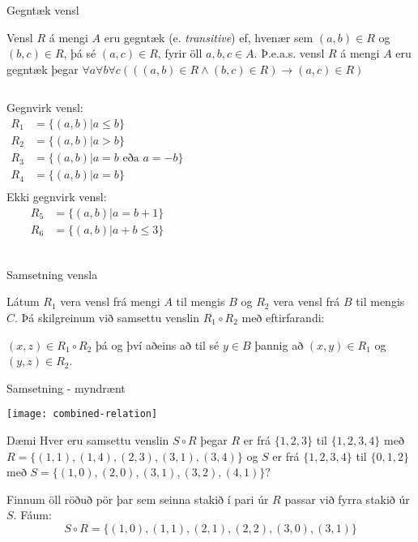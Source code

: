 \documentclass[handout]{beamer}
\begin{document}
\begin{frame}[fragile]{Gegntæk vensl}
\begin{tcolorbox}[title=Gegntæk vensl]
Vensl $R$ á mengi $A$ eru gegntæk (e. \emph{transitive}) ef, hvenær sem $(a, b) \in R$ og $(b, c) \in R$, þá sé $(a, c) \in R$, fyrir öll $a, b, c \in A$. Þ.e.a.s. vensl $R$ á mengi $A$ eru gegntæk þegar $\forall a\forall b\forall c(((a, b) \in R \land (b, c) \in R) \to (a, c) \in R)$
\end{tcolorbox}
\begin{columns}
Gegnvirk vensl:
\begin{align*}
R_1 &= \{(a, b)|a \leq b\}\\
R_2 &= \{(a, b)|a > b\}\\
R_3 &= \{(a, b)|a = b \text{ eða } a = -b\}\\
R_4 &= \{(a, b)|a = b\}\\
\end{align*}
Ekki gegnvirk vensl:
\begin{align*}
R_5 &= \{(a, b)|a = b+1\}\\
R_6 &= \{(a, b)|a+b \leq 3\}\\
\end{align*}
\end{columns}
\end{frame}

\begin{frame}{Samsetning vensla}
\begin{tcolorbox}[title=Samsetning vensla]
Látum $R_1$ vera vensl frá mengi $A$ til mengis $B$ og $R_2$ vera vensl frá $B$ til mengis $C$. Þá skilgreinum við samsettu venslin $R_1 \circ R_2$ með eftirfarandi:

$(x,z) \in R_1 \circ R_2$ þá og því aðeins að til sé $y \in B$ þannig að $(x,y) \in R_1$ og $(y,z) \in R_2$.
\end{tcolorbox}
\end{frame}

\begin{frame}{Samsetning - myndrænt}
\begin{center}
\texttt{[image: combined-relation]}
\end{center}
\end{frame}

\begin{frame}{Dæmi}
Hver eru samsettu venslin $S \circ R$ þegar $R$ er frá $\{1, 2, 3\}$ til $\{1, 2, 3, 4\}$ með $R = \{(1, 1), (1, 4), (2, 3), (3, 1), (3, 4)\}$ og $S$ er frá $\{1, 2, 3, 4\}$ til $\{0, 1, 2\}$ með $S = \{(1, 0), (2, 0), (3, 1), (3, 2), (4, 1)\}$? \pause 

\vspace{0.5cm}
Finnum öll röðuð pör þar sem seinna stakið í pari úr $R$ passar við fyrra stakið úr $S$. Fáum:
\[
 S \circ R = \{(1, 0), (1, 1), (2, 1), (2, 2), (3, 0), (3, 1)\}
\]
\end{frame}
\end{document}
